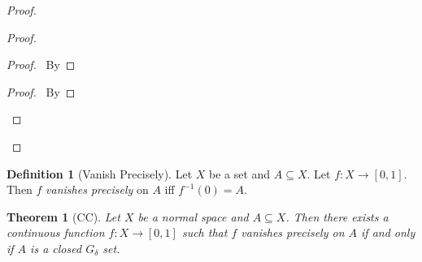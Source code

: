 \documentclass{report}
\let\qed\relax
\newtheorem{thm}[lm]{Theorem}
\theoremstyle{definition}
\newtheorem{df}[lm]{Definition}
\newcommand{\inv}[1]{\ensuremath{{#1}^{-1}}}
\begin{document}
\begin{proof}
\begin{proof}
     \begin{proof}
       \pf\ By 
     \end{proof}
     \begin{proof}
       \pf\ By 
     \end{proof}
   \end{proof}
   \qed
  \end{proof}

   \begin{df}[Vanish Precisely]
  Let $X$ be a set and $A \subseteq X$. Let $f : X \rightarrow [0,1]$. Then $f$
  \emph{vanishes precisely} on $A$ iff $\inv{f}(0) = A$.
 \end{df}

  \begin{thm}[CC]
    \label{thm:topology:normal:vanishes_precisely}
  Let $X$ be a normal space and $A \subseteq X$. Then there exists a continuous
function $f : X \rightarrow [0,1]$ such that $f$ vanishes precisely on $A$ if
and only if $A$ is a closed $G_\delta$ set.
 \end{thm}
\end{document}
